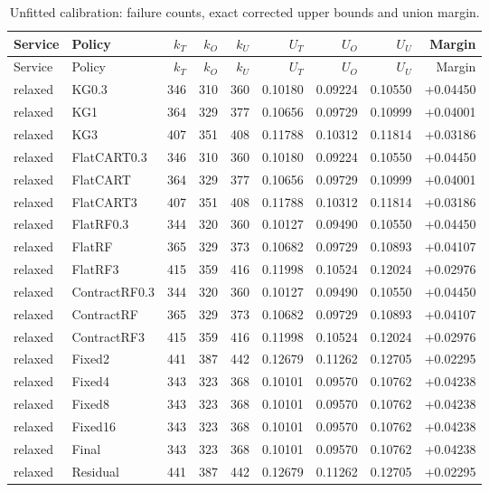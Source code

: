 \small\begin{longtable}{@{}llrrrrrrr@{}}
\caption{Unfitted calibration: failure counts, exact corrected upper bounds and union margin.}\label{supp:cards-unfitted}\\\toprule
Service & Policy & $k_T$ & $k_O$ & $k_U$ & $U_T$ & $U_O$ & $U_U$ & Margin\\\midrule\endfirsthead
\toprule
Service & Policy & $k_T$ & $k_O$ & $k_U$ & $U_T$ & $U_O$ & $U_U$ & Margin\\\midrule\endhead
relaxed & KG0.3 & 346 & 310 & 360 & 0.10180 & 0.09224 & 0.10550 & +0.04450\\
relaxed & KG1 & 364 & 329 & 377 & 0.10656 & 0.09729 & 0.10999 & +0.04001\\
relaxed & KG3 & 407 & 351 & 408 & 0.11788 & 0.10312 & 0.11814 & +0.03186\\
relaxed & FlatCART0.3 & 346 & 310 & 360 & 0.10180 & 0.09224 & 0.10550 & +0.04450\\
relaxed & FlatCART & 364 & 329 & 377 & 0.10656 & 0.09729 & 0.10999 & +0.04001\\
relaxed & FlatCART3 & 407 & 351 & 408 & 0.11788 & 0.10312 & 0.11814 & +0.03186\\
relaxed & FlatRF0.3 & 344 & 320 & 360 & 0.10127 & 0.09490 & 0.10550 & +0.04450\\
relaxed & FlatRF & 365 & 329 & 373 & 0.10682 & 0.09729 & 0.10893 & +0.04107\\
relaxed & FlatRF3 & 415 & 359 & 416 & 0.11998 & 0.10524 & 0.12024 & +0.02976\\
relaxed & ContractRF0.3 & 344 & 320 & 360 & 0.10127 & 0.09490 & 0.10550 & +0.04450\\
relaxed & ContractRF & 365 & 329 & 373 & 0.10682 & 0.09729 & 0.10893 & +0.04107\\
relaxed & ContractRF3 & 415 & 359 & 416 & 0.11998 & 0.10524 & 0.12024 & +0.02976\\
relaxed & Fixed2 & 441 & 387 & 442 & 0.12679 & 0.11262 & 0.12705 & +0.02295\\
relaxed & Fixed4 & 343 & 323 & 368 & 0.10101 & 0.09570 & 0.10762 & +0.04238\\
relaxed & Fixed8 & 343 & 323 & 368 & 0.10101 & 0.09570 & 0.10762 & +0.04238\\
relaxed & Fixed16 & 343 & 323 & 368 & 0.10101 & 0.09570 & 0.10762 & +0.04238\\
relaxed & Final & 343 & 323 & 368 & 0.10101 & 0.09570 & 0.10762 & +0.04238\\
relaxed & Residual & 441 & 387 & 442 & 0.12679 & 0.11262 & 0.12705 & +0.02295\\

\end{longtable}
